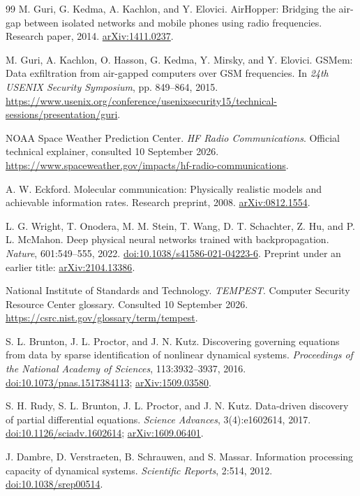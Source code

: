 \documentclass[11pt,a4paper]{article}
\theoremstyle{definition}
\theoremstyle{remark}
\begin{document}
\begin{thebibliography}{99}
M. Guri, G. Kedma, A. Kachlon, and Y. Elovici. AirHopper: Bridging the air-gap between isolated networks and mobile phones using radio frequencies. Research paper, 2014. \href{https://arxiv.org/abs/1411.0237}{arXiv:1411.0237}.

M. Guri, A. Kachlon, O. Hasson, G. Kedma, Y. Mirsky, and Y. Elovici. GSMem: Data exfiltration from air-gapped computers over GSM frequencies. In \emph{24th USENIX Security Symposium}, pp. 849--864, 2015. \url{https://www.usenix.org/conference/usenixsecurity15/technical-sessions/presentation/guri}.

NOAA Space Weather Prediction Center. \emph{HF Radio Communications}. Official technical explainer, consulted 10 September 2026. \url{https://www.spaceweather.gov/impacts/hf-radio-communications}.

A. W. Eckford. Molecular communication: Physically realistic models and achievable information rates. Research preprint, 2008. \href{https://arxiv.org/abs/0812.1554}{arXiv:0812.1554}.

L. G. Wright, T. Onodera, M. M. Stein, T. Wang, D. T. Schachter, Z. Hu, and P. L. McMahon. Deep physical neural networks trained with backpropagation. \emph{Nature}, 601:549--555, 2022. \href{https://doi.org/10.1038/s41586-021-04223-6}{doi:10.1038/s41586-021-04223-6}. Preprint under an earlier title: \href{https://arxiv.org/abs/2104.13386}{arXiv:2104.13386}.

National Institute of Standards and Technology. \emph{TEMPEST}. Computer Security Resource Center glossary. Consulted 10 September 2026. \url{https://csrc.nist.gov/glossary/term/tempest}.

S. L. Brunton, J. L. Proctor, and J. N. Kutz. Discovering governing equations from data by sparse identification of nonlinear dynamical systems. \emph{Proceedings of the National Academy of Sciences}, 113:3932--3937, 2016. \href{https://doi.org/10.1073/pnas.1517384113}{doi:10.1073/pnas.1517384113}; \href{https://arxiv.org/abs/1509.03580}{arXiv:1509.03580}.

S. H. Rudy, S. L. Brunton, J. L. Proctor, and J. N. Kutz. Data-driven discovery of partial differential equations. \emph{Science Advances}, 3(4):e1602614, 2017. \href{https://doi.org/10.1126/sciadv.1602614}{doi:10.1126/sciadv.1602614}; \href{https://arxiv.org/abs/1609.06401}{arXiv:1609.06401}.

J. Dambre, D. Verstraeten, B. Schrauwen, and S. Massar. Information processing capacity of dynamical systems. \emph{Scientific Reports}, 2:514, 2012. \href{https://doi.org/10.1038/srep00514}{doi:10.1038/srep00514}.


\end{thebibliography}
\end{document}
